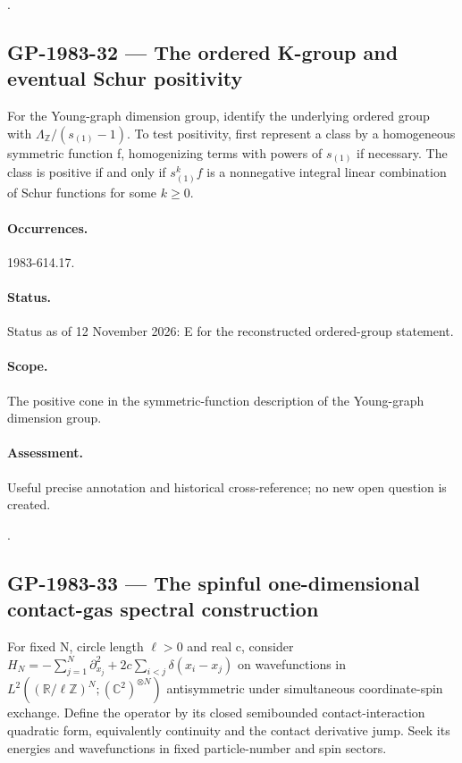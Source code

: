 \noindent\citep{vershikkerov1985dimensions,aggarwalelboim2026maximal}.

\subsection{GP-1983-32 --- The ordered K-group and eventual Schur positivity}

\label{problem:GP-1983-32}

For the Young-graph dimension group, identify the underlying ordered group with $\Lambda_{\mathbb Z}/(s_{(1)}-1)$. To test positivity, first represent a class by a homogeneous symmetric function f, homogenizing terms with powers of $s_{(1)}$ if necessary. The class is positive if and only if $s_{(1)}^k f$ is a nonnegative integral linear combination of Schur functions for some $k\geq0$.

\paragraph{Occurrences.} 1983-614.17.

\paragraph{Status.} Status as of 12 November 2026: E for the reconstructed ordered-group statement.

\paragraph{Scope.} The positive cone in the symmetric-function description of the Young-graph dimension group.

\paragraph{Assessment.} Useful precise annotation and historical cross-reference; no new open question is created.

\noindent\citep{vershikkerov1983kfunctor}.

\subsection{GP-1983-33 --- The spinful one-dimensional contact-gas spectral construction}

\label{problem:GP-1983-33}

For fixed N, circle length $\ell>0$ and real c, consider $H_N=-\sum_{j=1}^N\partial_{x_j}^2+2c\sum_{i<j}\delta(x_i-x_j)$ on wavefunctions in $L^2((\mathbb R/\ell\mathbb Z)^N;(\mathbb C^2)^{\otimes N})$ antisymmetric under simultaneous coordinate-spin exchange. Define the operator by its closed semibounded contact-interaction quadratic form, equivalently continuity and the contact derivative jump. Seek its energies and wavefunctions in fixed particle-number and spin sectors.

